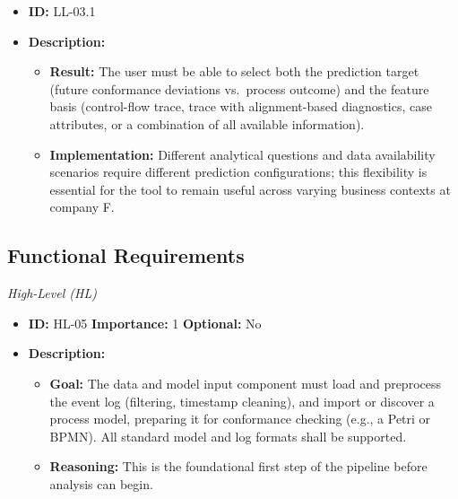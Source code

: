 \documentclass[12pt,a4paper]{article}
\begin{document}
\begin{itemize}
    \item \textbf{ID:} LL-03.1
    \item \textbf{Description:}
    \begin{itemize}
        \item \textbf{Result:} The user must be able to select both the prediction target (future conformance deviations vs.\ process outcome) and the feature basis (control-flow trace, trace with alignment-based diagnostics, case attributes, or a combination of all available information).
        \item \textbf{Implementation:} Different analytical questions and data availability scenarios require different prediction configurations; this flexibility is essential for the tool to remain useful across varying business contexts at company F.
    \end{itemize}
\end{itemize}
\vspace{1.5em}

\subsection{Functional Requirements}

\noindent \textit{High-Level (HL)}

\begin{itemize}
    \item \textbf{ID:} HL-05
 \textbf{Importance:} 1
 \textbf{Optional:} No
    \item \textbf{Description:}
    \begin{itemize}
        \item \textbf{Goal:} The data and model input component must load and preprocess the event log (filtering, timestamp cleaning), and import or discover a process model, preparing it for conformance checking (e.g., a Petri or BPMN). All standard model and log formats shall be supported.
        \item \textbf{Reasoning:} This is the foundational first step of the pipeline before analysis can begin.
    \end{itemize}
\end{itemize}
\vspace{1.5em}
\end{document}
